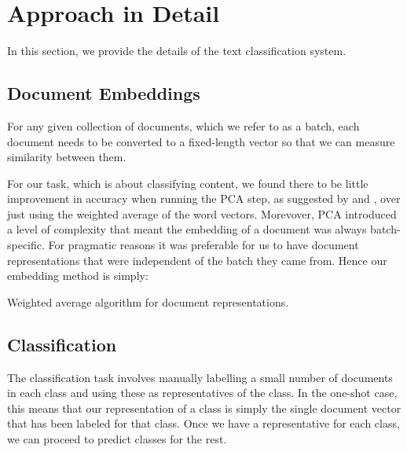 \section{Approach in Detail} \label{approach}
In this section, we provide the details of the text classification system.

\subsection{Document Embeddings}
 For any given collection of documents, which we refer to as a batch, each document needs to be converted to a fixed-length vector so that we can measure similarity between them. 

For our task, which is about classifying content, we found there to be little improvement in accuracy when running the PCA step, as suggested by \citep{arora2017asimple} and \citep{mu2017allbuttop}, over just using the weighted average of the word vectors. Morevover, PCA introduced a level of complexity that meant the embedding of a document was always batch-specific. For pragmatic reasons it was preferable for us to have document representations that were independent of the batch they came from. Hence our embedding method is simply:

\begin{algorithm}[!h]

\caption{Weighted average algorithm for document representations.}
\label{algo:representation}
\end{algorithm}

\subsection{Classification}
The classification task involves manually labelling a small number of documents in each class and using these as representatives of the class. In the one-shot case, this means that our representation of a class is simply the single document vector that has been labeled for that class. Once we have a representative for each class, we can proceed to predict classes for the rest.

